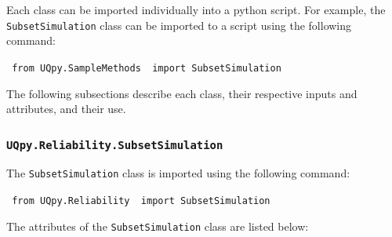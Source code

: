 \noindent
Each class can be imported individually into a python script. For example, the \texttt{SubsetSimulation} class can be imported to a script using the following command:

\vspace{4mm}
\texttt{{\color{blue} from} \texttt{UQpy.SampleMethods} {\color{blue} import} SubsetSimulation}
\vspace{4mm}

\noindent
The following subsections describe each class, their respective inputs and attributes, and their use.


\subsubsection{\texttt{UQpy.Reliability.SubsetSimulation}}


The \texttt{SubsetSimulation} class is imported using the following command:

\vspace{4mm}
\texttt{{\color{blue} from} \texttt{UQpy.Reliability} {\color{blue} import} SubsetSimulation}
\vspace{4mm}

\noindent
The attributes of the \texttt{SubsetSimulation} class are listed below:

